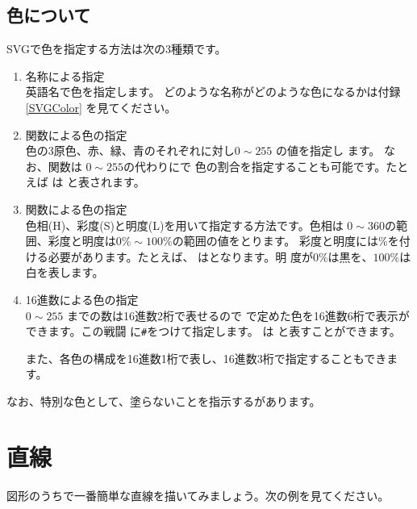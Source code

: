 \subsection{色について}\label{howtoindicatecolor}
SVGで色を指定する方法は次の3種類です。
\begin{enumerate}
 \item 名称による指定\\英語名で色を指定します。
 どのような名称がどのような色になるかは付録\ref{SVGColor}%
を見てください。
 \item {}関数による色の指定\\
色の3原色、赤、緑、青のそれぞれに対し$0\sim255$ の値を指定し
       ます。%
%
なお、関数は $0\sim255$の代わりに\Showattrib{\%}で
       色の割合を指定することも可能です。たとえば  は
        と表されます。
 \item {}関数による色の指定\\
			 色相(H)、彩度(S)と明度(L)を用いて指定する方法です。色相は
			 $0\sim360$の範囲、彩度と明度は$0\%\sim100\%$の範囲の値をとります。
			 彩度と明度には\%を付ける必要があります。たとえば、
			 はとなります。明
			 度が$0\%$は黒を、$100\%$は白を表します。
 \item 16進数による色の指定\\
$0\sim255$ までの数は16進数2桁で表せるので
       で定めた色を16進数6桁で表示ができます。この戦闘
			 に\texttt{\#}をつけて指定します。
			 は  と表すことができます。

また、各色の構成を16進数1桁で表し、16進数3桁で指定することもできます。
\end{enumerate}
%
なお、特別な色として、塗らないことを指示するがあります。
\section{直線}
図形のうちで一番簡単な直線を描いてみましょう。次の例を見てください。

